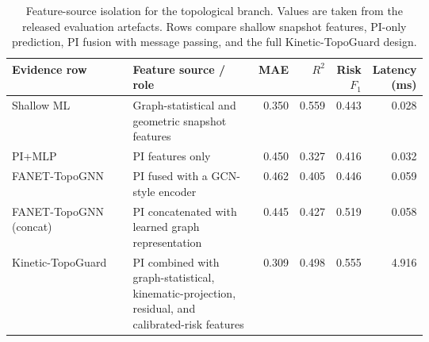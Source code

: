 \begin{table}[t]
\centering
\small
\caption{Feature-source isolation for the topological branch. Values are taken from the released evaluation artefacts. Rows compare shallow snapshot features, PI-only prediction, PI fusion with message passing, and the full Kinetic-TopoGuard design.}
\label{tab:feature_source_ablation}
\begin{adjustbox}{max width=\linewidth}
\begin{tabular}{p{0.30\linewidth}p{0.31\linewidth}rrrr}
\toprule
Evidence row & Feature source / role & MAE & $R^2$ & Risk $F_1$ & Latency (ms) \\
\midrule
Shallow ML & Graph-statistical and geometric snapshot features & 0.350 & 0.559 & 0.443 & 0.028 \\
PI+MLP & PI features only & 0.450 & 0.327 & 0.416 & 0.032 \\
FANET-TopoGNN & PI fused with a GCN-style encoder & 0.462 & 0.405 & 0.446 & 0.059 \\
FANET-TopoGNN (concat) & PI concatenated with learned graph representation & 0.445 & 0.427 & 0.519 & 0.058 \\
Kinetic-TopoGuard & PI combined with graph-statistical, kinematic-projection, residual, and calibrated-risk features & 0.309 & 0.498 & 0.555 & 4.916 \\
\bottomrule
\end{tabular}
\end{adjustbox}
\end{table}
